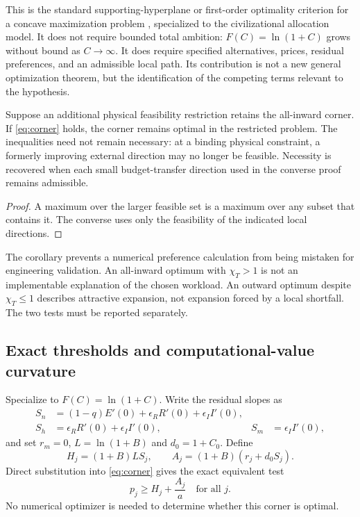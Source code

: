 This is the standard supporting-hyperplane or first-order optimality criterion for a concave maximization problem \citep[chapters 3--5]{BoydVandenberghe2004}, specialized to the civilizational allocation model. It does not require bounded total ambition: $F(C)=\ln(1+C)$ grows without bound as $C\to\infty$. It does require specified alternatives, prices, residual preferences, and an admissible local path. Its contribution is not a new general optimization theorem, but the identification of the competing terms relevant to the hypothesis.

\begin{corollary}
\label{cor:feasibility}
Suppose an additional physical feasibility restriction retains the all-inward corner. If \cref{eq:corner} holds, the corner remains optimal in the restricted problem. The inequalities need not remain necessary: at a binding physical constraint, a formerly improving external direction may no longer be feasible. Necessity is recovered when each small budget-transfer direction used in the converse proof remains admissible.
\end{corollary}
\begin{proof}
A maximum over the larger feasible set is a maximum over any subset that contains it. The converse uses only the feasibility of the indicated local directions.
\end{proof}

The corollary prevents a numerical preference calculation from being mistaken for engineering validation. An all-inward optimum with $\chi_T>1$ is not an implementable explanation of the chosen workload. An outward optimum despite $\chi_T\leq1$ describes attractive expansion, not expansion forced by a local shortfall. The two tests must be reported separately.

\subsection{Exact thresholds and computational-value curvature}
\label{sec:threshold}

Specialize to $F(C)=\ln(1+C)$. Write the residual slopes as
\begin{align}
 S_n&=(1-q)E'(0)+\epsilon_RR'(0)+\epsilon_II'(0),\nonumber\\
 S_h&=\epsilon_RR'(0)+\epsilon_II'(0),& S_m&=\epsilon_II'(0),
 \label{eq:slopes}
\end{align}
and set $r_m=0$, $L=\ln(1+B)$ and $d_0=1+C_0$. Define
\begin{equation}
 H_j=(1+B)L S_j,\qquad A_j=(1+B)(r_j+d_0S_j).
 \label{eq:HA}
\end{equation}
Direct substitution into \cref{eq:corner} gives the exact equivalent test
\begin{equation}
 \boxed{p_j\geq H_j+\frac{A_j}{a}\quad\text{for all }j.}
 \label{eq:exact}
\end{equation}
No numerical optimizer is needed to determine whether this corner is optimal.

